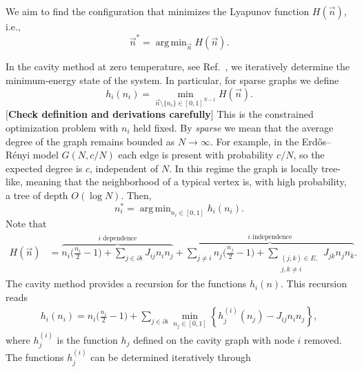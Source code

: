 \documentclass[11pt,a4paper]{article}
\DeclareMathOperator*{\argmin}{arg\,min}
\begin{document}
\newcommand{\appsubsection}[2]{%
    \refstepcounter{subsection}%
    \subsection*{\texorpdfstring{\thesubsection\ #2}{\thesubsection\space #2}}%
    \label{#1}%
}

We aim to find the configuration that minimizes the Lyapunov function $H(\vec n)$, i.e.,
\begin{equation}
    \vec{n}^\ast = \argmin_{\vec{n}} H(\vec{n}).
\end{equation}


In the cavity method at zero temperature, see Ref.~\cite{mezard2003cavity}, we iteratively determine the minimum-energy state of the system. In particular, for sparse graphs we define
\begin{equation}
    h_i(n_i) = \min_{\vec n \setminus \{n_i\} \in [0,1]^{N-1}} H(\vec n).
\end{equation} 
[{\bf Check definition and derivations carefully}]
This is the constrained optimization problem with $n_i$ held fixed.
By \emph{sparse} we mean that the average degree of the graph remains bounded as $N\to\infty$.
For example, in the Erd\H{o}s--R\'enyi model $G(N,c/N)$ each edge is present with probability $c/N$, so the expected degree is $c$, independent of $N$. In this regime the graph is locally tree-like, meaning that the neighborhood of a typical vertex is, with high probability, a tree of depth $O(\log N)$.
Then,
\begin{equation}
    n^\ast_i = \argmin_{n_i \in [0,1]} h_i(n_i).
\end{equation}
Note that
\begin{align}
    H(\vec n) &=
    \overbrace{n_i\bigg( \frac{n_i}{2} -1 \bigg) + \sum_{j \in \partial i} J_{ij} n_i n_j}^{i \text{ dependence}}
    + \overbrace{\sum_{j \neq i} n_j\bigg( \frac{n_j}{2} -1 \bigg) + \sum_{\substack{(j,k) \in E, \\ j,k \neq i}} J_{jk} n_j n_k}^{i \text{ independence}}.
\end{align}
The cavity method provides a recursion for the functions $h_i(n)$. This recursion reads
\begin{align}
    h_i(n_i) = n_i \bigg(\frac{n_i}{2} - 1\bigg) + \sum_{j \in \partial i}\min_{n_j \in [0,1]} \left\{h^{(i)}_j(n_j) - J_{ij} n_i n_j \right\},
\end{align}
where $h^{(i)}_j$ is the function $h_j$ defined on the cavity graph with node $i$ removed. The functions $h^{(i)}_j$ can be determined iteratively through
\end{document}
